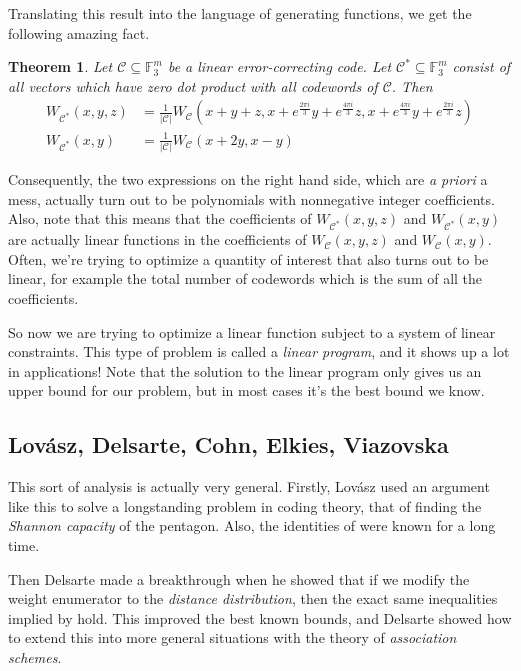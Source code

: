 \documentclass{article}
\newtheorem{thm}{Theorem}
\theoremstyle{definition}
\theoremstyle{remark}
\begin{document}
Translating this result into the language of generating functions, we get the following amazing fact.

\begin{thm}\label{t:macwilliams}
    Let $\mathcal C\subseteq\mathbb F_3^m$ be a linear error-correcting code. Let $\mathcal C^*\subseteq\mathbb F_3^m$ consist of all vectors which have zero dot product with all codewords of $\mathcal C$. Then
    \begin{align*}
        W_{\mathcal C^*}(x,y,z)&=\frac{1}{ |\mathcal C| }W_{\mathcal C}(x+y+z,x+e^{\frac{2\pi i}3}y+e^{\frac{4\pi i}3}z,x+e^{\frac{4\pi i}3}y+e^{\frac{2\pi i}3}z)\\
        W_{\mathcal C^*}(x,y)&=\frac{1}{ |\mathcal C| }W_{\mathcal C}(x+2y,x-y)
    \end{align*}
\end{thm}

Consequently, the two expressions on the right hand side, which are \emph{a priori} a mess, actually turn out to be polynomials with nonnegative integer coefficients. Also, note that this means that the coefficients of $W_{\mathcal C^*}(x,y,z)$ and $W_{\mathcal C^*}(x,y)$ are actually linear functions in the coefficients of $W_{\mathcal C}(x,y,z)$ and $W_{\mathcal C}(x,y)$. Often, we're trying to optimize a quantity of interest that also turns out to be linear, for example the total number of codewords which is the sum of all the coefficients.

So now we are trying to optimize a linear function subject to a system of linear constraints. This type of problem is called a \emph{linear program}, and it shows up a lot in applications! Note that the solution to the linear program only gives us an upper bound for our problem, but in most cases it's the best bound we know.

\subsection{Lov\'asz, Delsarte, Cohn, Elkies, Viazovska}
This sort of analysis is actually very general. Firstly, Lov\'asz used an argument like this to solve a longstanding problem in coding theory, that of finding the \emph{Shannon capacity} of the pentagon. Also, the identities of  were known for a long time.

Then Delsarte made a breakthrough when he showed that if we modify the weight enumerator to the \emph{distance distribution}, then the exact same inequalities implied by  hold. This improved the best known bounds, and Delsarte showed how to extend this into more general situations with the theory of \emph{association schemes}.
\end{document}
